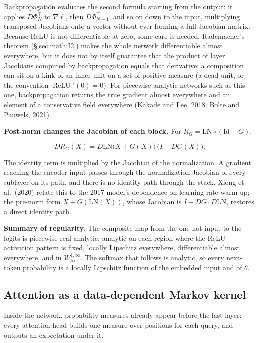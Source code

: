 Backpropagation evaluates the second formula starting from the output:
it applies \(D\Phi_N^{\top}\) to \(\nabla\ell\), then \(D\Phi_{N-1}^{\top}\), and
so on down to the input, multiplying transposed Jacobians onto a vector
without ever forming a full Jacobian matrix. Because ReLU is not
differentiable at zero, some care is needed. Rademacher's theorem
(\S\ref{sec:math:I2}) makes the whole network differentiable almost everywhere,
but it does not by itself guarantee that the product of layer Jacobians
computed by backpropagation equals that derivative: a composition can
sit on a kink of an inner unit on a set of positive measure (a dead unit,
or the convention \(\operatorname{ReLU}'(0) = 0\)). For piecewise-analytic networks
such as this one, backpropagation returns the true gradient almost
everywhere and an element of a conservative field everywhere (Kakade and
Lee, 2018; Bolte and Pauwels, 2021).

\textbf{Post-norm changes the Jacobian of each block.} For \(R_G = \mathrm{LN}\circ
(\mathrm{Id} + G)\),

\[
DR_G(X) = D\mathrm{LN}\big(X + G(X)\big)\,\big(I + DG(X)\big).
\]

The identity term is multiplied by the Jacobian of the normalization. A
gradient reaching the encoder input passes through the normalization
Jacobian of every sublayer on its path, and there is no identity path
through the stack. Xiong et al.~(2020) relate this to the 2017 model's
dependence on learning-rate warm-up; the pre-norm form \(X + G(\mathrm{LN}(X))\),
whose Jacobian is \(I + DG\cdot D\mathrm{LN}\), restores a direct identity path.

\textbf{Summary of regularity.} The composite map from the one-hot input
to the logits is piecewise real-analytic: analytic on each region where
the ReLU activation pattern is fixed, locally Lipschitz everywhere,
differentiable almost everywhere, and in \(W^{1,\infty}_{\mathrm{loc}}\). The softmax
that follows is analytic, so every next-token probability is a locally
Lipschitz function of the embedded input and of \(\theta\).

\subsection{Attention as a data-dependent Markov
kernel}\label{sec:math:IV3}

Inside the network, probability measures already appear before the last
layer: every attention head builds one measure over positions for each
query, and outputs an expectation under it.

